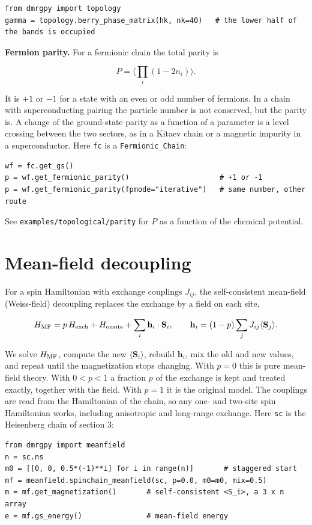\documentclass[11pt]{article}
\begin{document}
\begin{lstlisting}
from dmrgpy import topology
gamma = topology.berry_phase_matrix(hk, nk=40)   # the lower half of the bands is occupied
\end{lstlisting}

\textbf{Fermion parity.} For a fermionic chain the total parity is

\[P=\Big\langle\prod_i(1-2n_i)\Big\rangle.\]

It is \(+1\) or \(-1\) for a state with an even or odd number of fermions. In
a chain with superconducting pairing the particle number is not
conserved, but the parity is. A change of the ground-state parity as a
function of a parameter is a level crossing between the two sectors, as
in a Kitaev chain or a magnetic impurity in a superconductor. Here \texttt{fc} is
a \texttt{Fermionic\_\allowbreak{}Chain}:

\begin{lstlisting}
wf = fc.get_gs()
p = wf.get_fermionic_parity()                     # +1 or -1
p = wf.get_fermionic_parity(fpmode="iterative")   # same number, other route
\end{lstlisting}

See \texttt{examples/topological/parity} for \(P\) as a function of the chemical
potential.

\section{Mean-field decoupling}

For a spin Hamiltonian with exchange couplings \(J_{ij}\), the
self-consistent mean-field (Weiss-field) decoupling replaces the exchange
by a field on each site,

\[H_{\rm MF}=p\,H_{\rm exch}+H_{\rm onsite}+\sum_i\mathbf h_i\cdot\mathbf S_i,
\qquad\mathbf h_i=(1-p)\sum_jJ_{ij}\langle\mathbf S_j\rangle.\]

We solve \(H_{\rm MF}\), compute the new \(\langle\mathbf S_i\rangle\), rebuild
\(\mathbf h_i\), mix the old and new values, and repeat until the
magnetization stops changing. With \(p=0\) this is pure mean-field theory.
With \(0<p<1\) a fraction \(p\) of the exchange is kept and treated exactly,
together with the field. With \(p=1\) it is the original model. The
couplings are read from the Hamiltonian of the chain, so any one- and
two-site spin Hamiltonian works, including anisotropic and long-range
exchange. Here \texttt{sc} is the Heisenberg chain of section 3:

\begin{lstlisting}
from dmrgpy import meanfield
n = sc.ns
m0 = [[0, 0, 0.5*(-1)**i] for i in range(n)]       # staggered start
mf = meanfield.spinchain_meanfield(sc, p=0.0, m0=m0, mix=0.5)
m = mf.get_magnetization()       # self-consistent <S_i>, a 3 x n array
e = mf.gs_energy()               # mean-field energy
\end{lstlisting}
\end{document}
